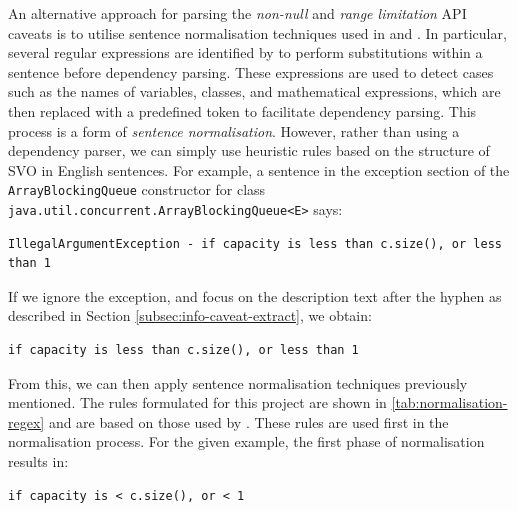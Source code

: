 An alternative approach for parsing the \textit{non-null} and \textit{range limitation} API caveats is to utilise sentence normalisation techniques used in \cite{zhou-directive} and \cite{blasi2018translating}. In particular, several regular expressions are identified by \citeauthor{zhou-directive} to perform substitutions within a sentence before dependency parsing. These expressions are used to detect cases such as the names of variables, classes, and mathematical expressions, which are then replaced with a predefined token to facilitate dependency parsing. This process is a form of \textit{sentence normalisation}. However, rather than using a dependency parser, we can simply use heuristic rules based on the structure of SVO in English sentences. For example, a sentence in the exception section of the \lstinline{ArrayBlockingQueue} constructor for class \lstinline{java.util.concurrent.ArrayBlockingQueue<E>} says:

\begin{verbatim}
IllegalArgumentException - if capacity is less than c.size(), or less than 1
\end{verbatim}

If we ignore the exception, and focus on the description text after the hyphen as described in Section \ref{subsec:info-caveat-extract}, we obtain:

\begin{verbatim}
if capacity is less than c.size(), or less than 1
\end{verbatim}

From this, we can then apply sentence normalisation techniques previously mentioned. The rules formulated for this project are shown in \ref{tab:normalisation-regex} and are based on those used by \cite{blasi2018translating}. These rules are used first in the normalisation process. For the given example, the first phase of normalisation results in:

\begin{verbatim}
if capacity is < c.size(), or < 1
\end{verbatim}

